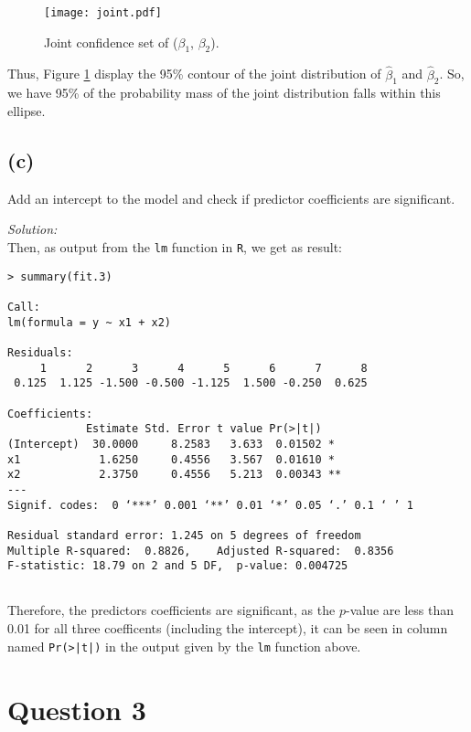 \documentclass[a4paper, 11pt]{article}
\begin{document}
\begin{figure}[H]
\centering
\texttt{[image: joint.pdf]}
\caption{Joint confidence set of ($\beta_1$, $\beta_2$).}
\label{Joint}
\end{figure}

Thus, Figure \ref{Joint} display the 95\% contour of the joint distribution of $\hat{\beta}_1$ and $\hat{\beta}_2$. So, we have 95\% of the probability mass of the joint distribution falls within this ellipse.

\subsection*{(c)} Add an intercept to the model and check if predictor coefficients are significant. 

\noindent
\textit{Solution:}\\

Then, as output from the \texttt{lm} function in \texttt{R}, we get as result:

\begin{verbatim}
> summary(fit.3)

Call:
lm(formula = y ~ x1 + x2)

Residuals:
     1      2      3      4      5      6      7      8 
 0.125  1.125 -1.500 -0.500 -1.125  1.500 -0.250  0.625 

Coefficients:
            Estimate Std. Error t value Pr(>|t|)   
(Intercept)  30.0000     8.2583   3.633  0.01502 * 
x1            1.6250     0.4556   3.567  0.01610 * 
x2            2.3750     0.4556   5.213  0.00343 **
---
Signif. codes:  0 ‘***’ 0.001 ‘**’ 0.01 ‘*’ 0.05 ‘.’ 0.1 ‘ ’ 1

Residual standard error: 1.245 on 5 degrees of freedom
Multiple R-squared:  0.8826,	Adjusted R-squared:  0.8356 
F-statistic: 18.79 on 2 and 5 DF,  p-value: 0.004725
 
\end{verbatim}

Therefore, the predictors coefficients are significant, as the $p$-value are less than 0.01 for all three  coefficents (including the intercept), it can be seen in column named \texttt{Pr(>|t|)} in the output given by the \texttt{lm} function above.

\section*{Question 3}
\end{document}

